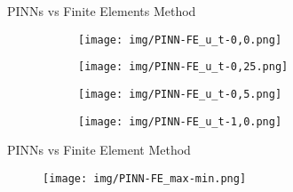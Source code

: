     \begin{frame}{PINNs vs Finite Elements Method}
        \vspace*{-0.3cm}
        \begin{figure}
            \begin{subfigure}{0.49\textwidth}
                \centering
                \texttt{[image: img/PINN-FE\_u\_t-0,0.png]}
            \end{subfigure}
            \begin{subfigure}{0.49\textwidth}
                \centering
                \texttt{[image: img/PINN-FE\_u\_t-0,25.png]}
            \end{subfigure}
            \begin{subfigure}{0.49\textwidth}
                \centering
                \texttt{[image: img/PINN-FE\_u\_t-0,5.png]}
            \end{subfigure}
            \begin{subfigure}{0.49\textwidth}
                \centering
                \texttt{[image: img/PINN-FE\_u\_t-1,0.png]}
            \end{subfigure}
        \end{figure}
    \end{frame}
    
    \begin{frame}{PINNs vs Finite Element Method}
        \begin{figure}
            \centering
            \texttt{[image: img/PINN-FE\_max-min.png]}
        \end{figure}
    \end{frame}